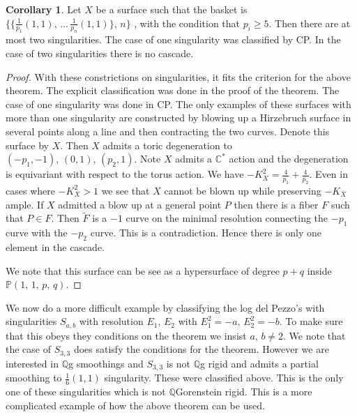 \documentclass[11pt]{amsbook}
\theoremstyle{definition}
\theoremstyle{definition}
\newtheorem{cor}[thm]{Corollary}
\theoremstyle{definition}
\theoremstyle{definition}
\theoremstyle{definition}
\theoremstyle{definition}
\theoremstyle{definition}
\theoremstyle{definition}
\newcommand{\ldp}{log del Pezzo}
\newcommand{\mb}[1]{\mathbb{#1}}
\begin{document}
\begin{cor}
Let $X$ be a surface such that the basket is  $\{ \{ \frac{1}{p_1}(1,1), \, \dots \, \frac{1}{p_n}(1,1) \}, \, n \}$ , with the condition that $p_i \geq 5$. Then there are at most two singularities. The case of one singularity was classified by CP. In the case of two singularities there is no cascade. 
\end{cor}
\begin{proof}
With these constrictions on singularities, it fits the criterion for the above theorem. The explicit classification was done in the proof of the theorem. The case of one singularity was done in CP. The only examples of these surfaces with more than one singularity are constructed by blowing up a Hirzebruch surface in several points along a line and then contracting the two curves. Denote this surface by $X$. Then $X$ admits a toric degeneration to $(-p_1, -1), \, (0, 1), \, (p_2, 1)$. Note $X$ admits a $\mb{C}^*$ action and the degeneration is equivariant with respect to the torus action. We have $-K_X^2 = \frac{4}{p_1} + \frac{4}{p_2}$. Even in cases where $-K_X^2 > 1$ we see that $X$ cannot be blown up while preserving $-K_X$ ample. If $X$ admitted a blow up at a general point $P$ then there is a fiber $F$ such that $P \in F$. Then $\widetilde F$ is a $-1$ curve on the minimal resolution connecting the $-p_1$ curve with the $-p_2$ curve. This is a contradiction. Hence there is only one element in the cascade.



We note that this surface can be see as a hypersurface of degree $p+q$ inside $\mb{P}(1,\,1,\,p,\,q)$.

\end{proof}
We now do a more difficult example by classifying the \ldp's with singularities $S_{a,b}$ with resolution $E_1, \, E_2$ with $E_1^2 = -a,\, E_2^2 = -b$. To make sure that this obeys they conditions on the theorem we insist $a, \, b \neq 2$. We note that the case of $S_{3,3}$ does satisfy the conditions for the theorem. However we are interested in $\mb{Q}$g smoothings and $S_{3,3}$ is not $\mb{Q}$g rigid and admits a partial smoothing to $\frac{1}{6}(1,1)$ singularity. These were classified above. This is the only one of these singularities which is not $\mb{Q}$Gorenstein rigid. This is a more complicated example of how the above theorem can be used.
\end{document}
